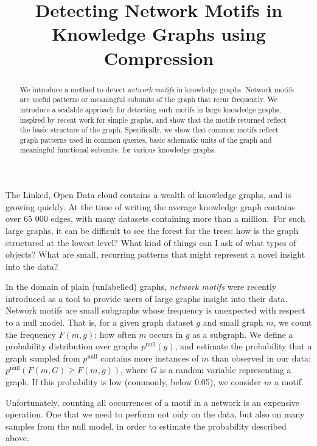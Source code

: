 \documentclass[11pt]{article}
\title{Detecting Network Motifs in Knowledge Graphs using Compression}
\begin{document}
\maketitle

\begin{abstract}
We introduce a method to detect \emph{network motifs} in knowledge graphs. Network motifs are useful patterns or meaningful subunits of the graph that recur frequently. We introduce a scalable approach for detecting such motifs in large knowledge graphs, inspired by recent work for simple graphs, and show that the motifs returned reflect the basic structure of the graph. Specifically, we show that common motifs reflect graph patterns used in common queries, basic schematic units of the graph and meaningful functional subunits, for various knowledge graphs.
\end{abstract}

\noindent The Linked, Open Data cloud contains a wealth of knowledge graphs, and is growing quickly. At the time of writing the average knowledge graph contains over 65 000 edges, with many datasets containing more than a million.\footnotemark~For such large graphs, it can be difficult to see the forest for the trees: how is the graph structured at the lowest level? What kind of things can I ask of what types of objects? What are small, recurring patterns that might represent a novel insight into the data?


In the domain of plain (unlabelled) graphs, \emph{network motifs} \cite{milo2002network} were recently introduced as a tool to provide users of large graphs insight into their data. Network motifs are small subgraphs whose frequency is unexpected with respect to a null model. That is, for a given graph dataset $g$ and small graph $m$, we count the frequency $F(m, g)$: how often $m$ occurs in $g$ as a subgraph. We define a probability distribution over graphs $p^\text{null}(g)$, and estimate the probability that a graph sampled from $p^\text{null}$ contains more instances of $m$ than observed in our data: $p^\text{null}(F(m, G) \geq F(m, g))$, where $G$ is a random variable representing a graph. If this probability is low (commonly, below 0.05), we consider $m$ a motif. \footnotemark

Unfortunately, counting all occurrences of a motif in a network is an expensive operation. One that we need to perform not only on the data, but also on many samples from the null model, in order to estimate the probability described above.
\end{document}
